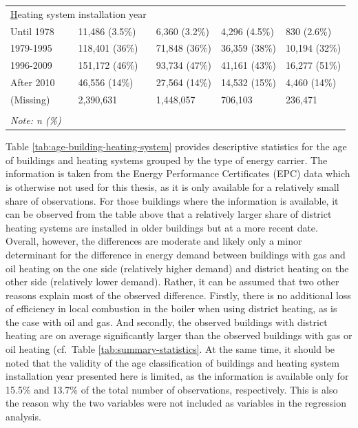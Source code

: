 \documentclass[12pt,twoside]{reedthesis}
\begin{document}
\begin{table}[]
{\begin{tabular}{@{}lllll@{}}
\multicolumn{2}{l}{{\ul Heating system installation year}} &                 &               &               \\
Until 1978                            & 11,486 (3.5\%)     & 6,360 (3.2\%)   & 4,296 (4.5\%) & 830 (2.6\%)   \\
1979-1995                             & 118,401 (36\%)     & 71,848 (36\%)   & 36,359 (38\%) & 10,194 (32\%) \\
1996-2009                             & 151,172 (46\%)     & 93,734 (47\%)   & 41,161 (43\%) & 16,277 (51\%) \\
After 2010                            & 46,556 (14\%)      & 27,564 (14\%)   & 14,532 (15\%) & 4,460 (14\%)  \\
(Missing)                             & 2,390,631          & 1,448,057       & 706,103       & 236,471       \\
                                      &                    &                 &               &               \\ \midrule
\textit{Note: n (\%)}                 &                    &                 &               &               \\ \bottomrule
\end{tabular}%
}
\end{table}
\noindent
Table \ref{tab:age-building-heating-system} provides descriptive statistics for the age of buildings and heating systems grouped by the type of energy carrier. The information is taken from the Energy Performance Certificates (EPC) data which is otherwise not used for this thesis, as it is only available for a relatively small share of observations. For those buildings where the information is available, it can be observed from the table above that a relatively larger share of district heating systems are installed in older buildings but at a more recent date. Overall, however, the differences are moderate and likely only a minor determinant for the difference in energy demand between buildings with gas and oil heating on the one side (relatively higher demand) and district heating on the other side (relatively lower demand). Rather, it can be assumed that two other reasons explain most of the observed difference. Firstly, there is no additional loss of efficiency in local combustion in the boiler when using district heating, as is the case with oil and gas. And secondly, the observed buildings with district heating are on average significantly larger than the observed buildings with gas or oil heating (cf.~Table \ref{tab:summary-statistics}. At the same time, it should be noted that the validity of the age classification of buildings and heating system installation year presented here is limited, as the information is available only for 15.5\% and 13.7\% of the total number of observations, respectively. This is also the reason why the two variables were not included as variables in the regression analysis.
\end{document}
